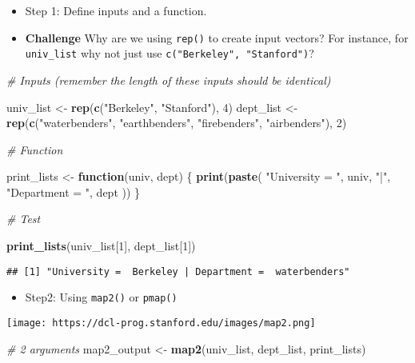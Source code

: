 \documentclass[
]{book}
\newenvironment{Shaded}{\begin{snugshade}}{\end{snugshade}}
\newcommand{\CommentTok}[1]{\textcolor[rgb]{0.56,0.35,0.01}{\textit{#1}}}
\newcommand{\ControlFlowTok}[1]{\textcolor[rgb]{0.13,0.29,0.53}{\textbf{#1}}}
\newcommand{\DecValTok}[1]{\textcolor[rgb]{0.00,0.00,0.81}{#1}}
\newcommand{\KeywordTok}[1]{\textcolor[rgb]{0.13,0.29,0.53}{\textbf{#1}}}
\newcommand{\NormalTok}[1]{#1}
\newcommand{\StringTok}[1]{\textcolor[rgb]{0.31,0.60,0.02}{#1}}
\providecommand{\tightlist}{%
  \setlength{\itemsep}{0pt}\setlength{\parskip}{0pt}}
\begin{document}
\begin{itemize}
\item
  Step 1: Define inputs and a function.
\item
  \textbf{Challenge} Why are we using \texttt{rep()} to create input vectors? For instance, for \texttt{univ\_list} why not just use \texttt{c("Berkeley",\ "Stanford")}?
\end{itemize}

\begin{Shaded}
\begin{Highlighting}[]
\CommentTok{\# Inputs (remember the length of these inputs should be identical)}

\NormalTok{univ\_list \textless{}{-}}\StringTok{ }\KeywordTok{rep}\NormalTok{(}\KeywordTok{c}\NormalTok{(}\StringTok{"Berkeley"}\NormalTok{, }\StringTok{"Stanford"}\NormalTok{), }\DecValTok{4}\NormalTok{)}
\NormalTok{dept\_list \textless{}{-}}\StringTok{ }\KeywordTok{rep}\NormalTok{(}\KeywordTok{c}\NormalTok{(}\StringTok{"waterbenders"}\NormalTok{, }\StringTok{"earthbenders"}\NormalTok{, }\StringTok{"firebenders"}\NormalTok{, }\StringTok{"airbenders"}\NormalTok{), }\DecValTok{2}\NormalTok{)}

\CommentTok{\# Function}

\NormalTok{print\_lists \textless{}{-}}\StringTok{ }\ControlFlowTok{function}\NormalTok{(univ, dept) \{}
  \KeywordTok{print}\NormalTok{(}\KeywordTok{paste}\NormalTok{(}
    \StringTok{"University = "}\NormalTok{, univ, }\StringTok{"|"}\NormalTok{,}
    \StringTok{"Department = "}\NormalTok{, dept}
\NormalTok{  ))}
\NormalTok{\}}

\CommentTok{\# Test}

\KeywordTok{print\_lists}\NormalTok{(univ\_list[}\DecValTok{1}\NormalTok{], dept\_list[}\DecValTok{1}\NormalTok{])}
\end{Highlighting}
\end{Shaded}

\begin{verbatim}
## [1] "University =  Berkeley | Department =  waterbenders"
\end{verbatim}

\begin{itemize}
\tightlist
\item
  Step2: Using \texttt{map2()} or \texttt{pmap()}
\end{itemize}

\texttt{[image: https://dcl-prog.stanford.edu/images/map2.png]}

\begin{Shaded}
\begin{Highlighting}[]
\CommentTok{\# 2 arguments}
\NormalTok{map2\_output \textless{}{-}}\StringTok{ }\KeywordTok{map2}\NormalTok{(univ\_list, dept\_list, print\_lists)}
\end{Highlighting}
\end{Shaded}
\end{document}
